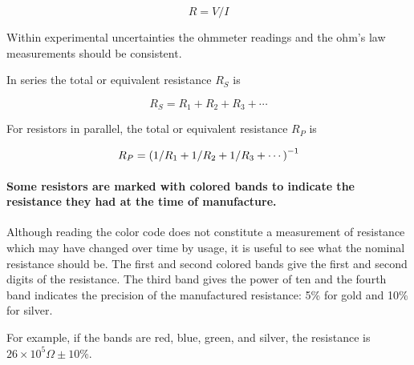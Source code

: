\begin{equation} R = V/I \label{e:ohm} \end{equation}


Within experimental uncertainties the ohmmeter readings and the ohm's law measurements should be consistent.  %

In series the total or equivalent resistance $R_S$ is 

\begin{equation} \label{e:ser}
	R_S  =  R_1  +  R_2  +  R_3  + \cdots	
\end{equation}

For resistors in parallel, the total or equivalent resistance $R_P$ is

\begin{equation} \label{e:par}
	R_P  =  \left( 1/R_1  +  1/R_2  +  1/R_3  + \cdots \right) \relax^{-1}
\end{equation}

\paragraph {Some resistors are marked with colored bands to indicate the resistance they had at the time of manufacture.}  Although reading the color code does not constitute a measurement of resistance which may have changed over time by usage, it is useful to see what the nominal resistance should be.  The first and second colored bands give the first and second digits of the resistance.  The third band gives the power of ten and the fourth band indicates the precision of the manufactured resistance:  5\% for gold and  10\% for silver.

For example, if the bands are red, blue, green, and silver, the resistance is $26 \times 10^5\Omega\pm10$\%.
%

